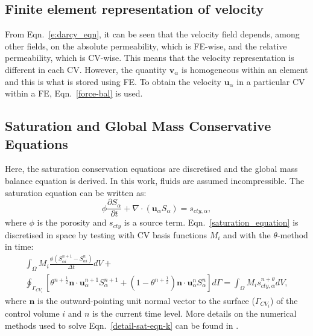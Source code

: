 \documentclass[preprint,authoryear,12pt]{elsarticle}
\begin{document}
\subsection{Finite element representation of velocity} \label{Section:Force_density}
From Eqn.~\ref{e:darcy_eqn}, it can be seen that the velocity field
depends, among other fields, on the absolute permeability, which is
FE-wise, and the relative permeability, which is CV-wise. This means
that the velocity representation is different in each CV. However, the
quantity $\mathbf{v}_\alpha$ is homogeneous within an element and this
is what is stored using FE. To obtain the velocity
$\mathbf{u}_{\alpha}$ in a particular CV within a FE,
Eqn.~\ref{force-bal} is used.


\subsection{Saturation and Global Mass Conservative Equations} \label{Section:Saturation_Global}
Here, the saturation conservation equations are discretised and the
global mass balance equation is derived. In this work, fluids are
assumed incompressible. The saturation equation can be written as:
\begin{equation}
  \phi\displaystyle\frac{\partial S_{\alpha} }{\partial t} + \nabla
  \cdot \left( {\mathbf u}_{\alpha} S_{\alpha}\right) =
  s_{cty,\alpha},
  \label{saturation_equation}
\end{equation}
where $\phi$ is the porosity and $s_{cty}$ is a source
term. Eqn.~\ref{saturation_equation} is discretised in space by
testing with CV basis functions $M_{i}$ and with the $\theta$-method
in time:
\begin{eqnarray}
  \int_{\Omega} M_{i} \displaystyle\frac{\phi \left({S_{\alpha
        i}^{n+1}}-{S_{\alpha i}^{n}}\right)}{\Delta t} dV + \nonumber
  \\ \oint_{\Gamma_{CV_{i}}} \left[\theta^{n+\frac{1}{2}} {\mathbf n}
    \cdot {\mathbf u}_{\alpha}^{n+1} S_{\alpha}^{n+1} +
    \left(1-\theta^{n+\frac{1}{2}}\right) {\mathbf n} \cdot {\mathbf
      u}_{\alpha}^{n} S_{\alpha}^{n} \right]d\Gamma = \int_{\Omega}
  M_{i} {s_{cty,\alpha}^{n+\theta}} dV,
  \label{detail-sat-eqn-k}
\end{eqnarray}
where $\mathbf{n}$ is the outward-pointing unit normal vector to the
surface ($\Gamma_{CV_{i}}$) of the control volume $i$ and $n$ is the
current time level. More details on the numerical methods used to
solve Eqn.~\ref{detail-sat-eqn-k} can be found in
\citet{pavlidis_2013b}.
\end{document}
